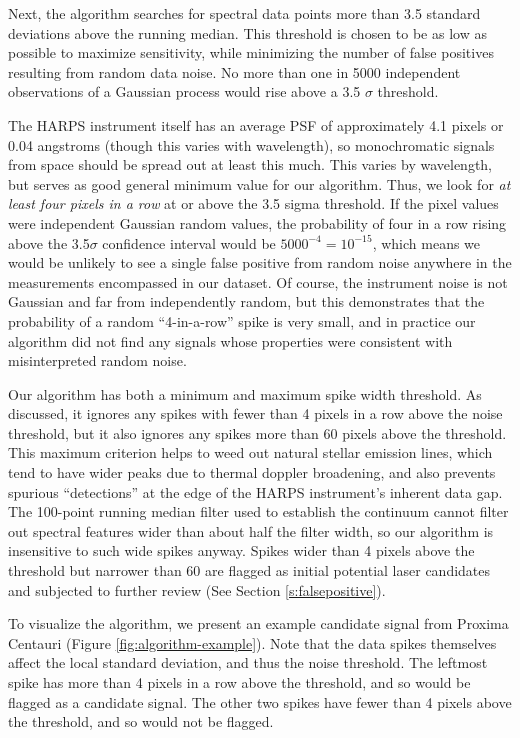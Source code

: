 \documentclass[linenumbers]{aastex631}
\begin{document}
Next, the algorithm searches for spectral data points more than 3.5 standard deviations above the running median.  This threshold is chosen to be as low as possible to maximize sensitivity, while minimizing the number of false positives resulting from random data noise.  No more than one in 5000 independent observations of a Gaussian process would rise above a 3.5 $\sigma$ threshold. 

The HARPS instrument itself has an average PSF of approximately 4.1 pixels \citep{HARPS_specs} or 0.04 angstroms (though this varies with wavelength), so monochromatic signals from space should be spread out at least this much. This varies by wavelength, but serves as good general minimum value for our algorithm. Thus, we look for \emph{at least four pixels in a row} at or above the 3.5 sigma threshold.  If the pixel values were independent Gaussian random values, the probability of four in a row rising above the 3.5$\sigma$ confidence interval would be $5000^{-4}=10^{-15}$, which means we would be unlikely to see a single false positive from random noise anywhere in the measurements encompassed in our dataset. Of course, the instrument noise is not Gaussian and far from independently random, but this demonstrates that the probability of a random ``4-in-a-row'' spike is very small, and in practice our algorithm did not find any signals whose properties were consistent with misinterpreted random noise.

Our algorithm has both a minimum and maximum spike width threshold.  As discussed, it ignores any spikes with fewer than 4 pixels in a row above the noise threshold, but it also ignores any spikes more than 60 pixels above the threshold.  This maximum criterion helps to weed out natural stellar emission lines, which tend to have wider peaks due to thermal doppler broadening, and also prevents spurious ``detections'' at the edge of the HARPS instrument's inherent data gap. The 100-point running median filter used to establish the continuum cannot filter out spectral features wider than about half the filter width, so our algorithm is insensitive to such wide spikes anyway.  Spikes wider than 4 pixels above the threshold but narrower than 60 are flagged as initial potential laser candidates and subjected to further review (See Section \ref{s:falsepositive}).

To visualize the algorithm, we present an example candidate signal from  Proxima Centauri (Figure \ref{fig:algorithm-example}).  Note that the data spikes themselves affect the local standard deviation, and thus the noise threshold. The leftmost spike has more than 4 pixels in a row above the threshold, and so would be flagged as a candidate signal. The other two spikes have fewer than 4 pixels above the threshold, and so would not be flagged.
\end{document}
